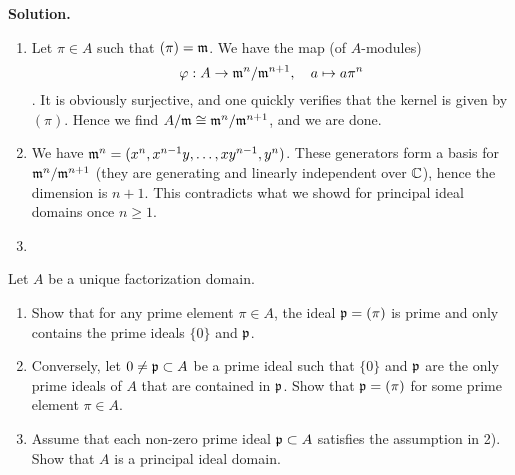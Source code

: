 \documentclass[a4paper,11pt]{article}
\begin{document}
\textbf{Solution.}
\begin{enumerate}
    \item Let $\pi \in A$ such that $(\pi) = \mathfrak{m}$. We have the map (of $A$-modules)
        $$\varphi: A \to \mathfrak{m}^n/\mathfrak{m}^{n+1}, \quad a \mapsto a \pi^n$$. 
        It is obviously surjective, and one quickly verifies that the kernel is
        given by $(\pi)$. Hence we find $A/\mathfrak{m} \cong \mathfrak{m}^n/\mathfrak{m}^{n+1}$, and we
        are done. 
    \item We have $\mathfrak{m}^n = (x^n, x^{n-1}y, \dots, xy^{n-1},y^n)$. These generators
        form a basis for $\mathfrak{m}^{n}/\mathfrak{m}^{n+1}$ (they are generating and linearly
        independent over $\mathbb{C}$), hence the dimension is $n+1$. This contradicts
        what we showd for principal ideal domains once $n \geq 1$. 
    \item 
\end{enumerate}

Let $A$ be a unique factorization domain. 
\begin{enumerate}
    \item Show that for any prime element $\pi \in A$, the ideal $\mathfrak{p} = (\pi)$ is 
        prime and only contains the prime ideals $\{0\}$ and $\mathfrak{p}$.
    \item Conversely, let $0 \neq \mathfrak{p} \subset A$ be a prime ideal such that $\{0\}$
        and $\mathfrak{p}$ are the only prime ideals of $A$ that are contained in $\mathfrak{p}$. 
        Show that $\mathfrak{p} = (\pi)$ for some prime element $\pi \in A$. 
    \item Assume that each non-zero prime ideal $\mathfrak{p} \subset A$ satisfies the
        assumption in 2). Show that $A$ is a principal ideal domain. 
\end{enumerate}
\end{document}

